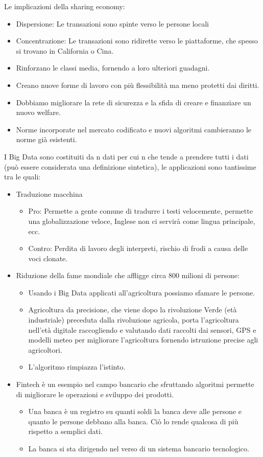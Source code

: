 \documentclass[a4page, 11pt]{article}
\begin{document}
Le implicazioni della sharing economy:
\begin{itemize}
	\item Dispersione: Le transazioni sono spinte verso le persone locali
	\item Concentrazione: Le transazioni sono ridirette verso le piattaforme, che spesso si trovano in California o Cina.
	\item Rinforzano le classi media, fornendo a loro ulteriori guadagni.
	\item Creano nuove forme di lavoro con più flessibilità ma meno protetti dai diritti.
	\item Dobbiamo migliorare la rete di sicurezza e la sfida di creare e finanziare un nuovo welfare.
	\item Norme incorporate nel mercato codificato e nuovi algoritmi cambieranno le norme già esistenti.
\end{itemize} 
I Big Data sono costituiti da n dati per cui n che tende a prendere tutti i dati (può essere considerata una definizione sintetica), le applicazioni sono tantissime tra le quali:
\begin{itemize}
	\item Traduzione macchina
	\begin{itemize}
		\item Pro: Permette a gente comune di tradurre i testi velocemente, permette una globalizzazione veloce, Inglese non ci servirà come lingua principale, ecc.
		\item Contro: Perdita di lavoro degli interpreti, rischio di frodi a causa delle voci clonate.
	\end{itemize}
	\item Riduzione della fame mondiale che affligge circa 800 milioni di persone:
	\begin{itemize}
		\item Usando i Big Data applicati all’agricoltura possiamo sfamare le persone.
		\item Agricoltura da precisione, che viene dopo la rivoluzione Verde (età industriale) preceduta dalla rivoluzione agricola, porta l’agricoltura nell’età digitale raccogliendo e valutando dati raccolti dai sensori, GPS e modelli meteo per migliorare l’agricoltura fornendo istruzione precise agli agricoltori. 
		\item L’algoritmo rimpiazza l’istinto.
	\end{itemize}
	\item Fintech è un esempio nel campo bancario che sfruttando algoritmi permette di migliorare le operazioni e sviluppo dei prodotti.
	\begin{itemize}
		\item Una banca è un registro su quanti soldi la banca deve alle persone e quanto le persone debbano alla banca. Ciò lo rende qualcosa di più rispetto a semplici dati.
		\item La banca si sta dirigendo nel verso di un sistema bancario tecnologico.
	\end{itemize}
\end{itemize}
\end{document}
